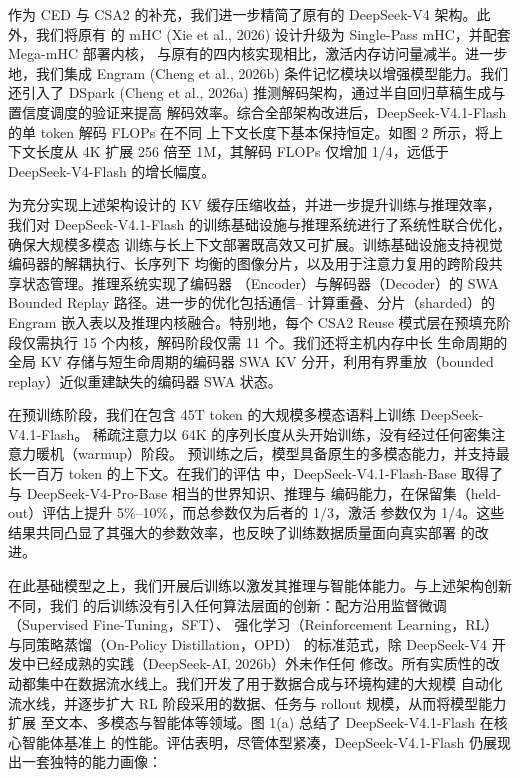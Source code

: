 作为 CED 与 CSA2 的补充，我们进一步精简了原有的 DeepSeek-V4 架构。此外，我们将原有
的 mHC (Xie et al., 2026) 设计升级为 Single-Pass mHC，并配套 Mega-mHC 部署内核，
与原有的四内核实现相比，激活内存访问量减半。进一步地，我们集成 Engram
(Cheng et al., 2026b) 条件记忆模块以增强模型能力。我们还引入了 DSpark
(Cheng et al., 2026a) 推测解码架构，通过半自回归草稿生成与置信度调度的验证来提高
解码效率。综合全部架构改进后，DeepSeek-V4.1-Flash 的单 token 解码 FLOPs 在不同
上下文长度下基本保持恒定。如图 2 所示，将上下文长度从 4K 扩展 256 倍至 1M，其解码
FLOPs 仅增加 1/4，远低于 DeepSeek-V4-Flash 的增长幅度。

为充分实现上述架构设计的 KV 缓存压缩收益，并进一步提升训练与推理效率，我们对
DeepSeek-V4.1-Flash 的训练基础设施与推理系统进行了系统性联合优化，确保大规模多模态
训练与长上下文部署既高效又可扩展。训练基础设施支持视觉编码器的解耦执行、长序列下
均衡的图像分片，以及用于注意力复用的跨阶段共享状态管理。推理系统实现了编码器
（Encoder）与解码器（Decoder）的 SWA Bounded Replay 路径。进一步的优化包括通信--
计算重叠、分片（sharded）的 Engram 嵌入表以及推理内核融合。特别地，每个 CSA2 Reuse
模式层在预填充阶段仅需执行 15 个内核，解码阶段仅需 11 个。我们还将主机内存中长
生命周期的全局 KV 存储与短生命周期的编码器 SWA KV 分开，利用有界重放（bounded
replay）近似重建缺失的编码器 SWA 状态。



在预训练阶段，我们在包含 45T token 的大规模多模态语料上训练 DeepSeek-V4.1-Flash。
稀疏注意力以 64K 的序列长度从头开始训练，没有经过任何密集注意力暖机（warmup）阶段。
预训练之后，模型具备原生的多模态能力，并支持最长一百万 token 的上下文。在我们的评估
中，DeepSeek-V4.1-Flash-Base 取得了与 DeepSeek-V4-Pro-Base 相当的世界知识、推理与
编码能力，在保留集（held-out）评估上提升 5\%--10\%，而总参数仅为后者的 1/3，激活
参数仅为 1/4。这些结果共同凸显了其强大的参数效率，也反映了训练数据质量面向真实部署
的改进。

在此基础模型之上，我们开展后训练以激发其推理与智能体能力。与上述架构创新不同，我们
的后训练没有引入任何算法层面的创新：配方沿用监督微调（Supervised Fine-Tuning，SFT）、
强化学习（Reinforcement Learning，RL）与同策略蒸馏（On-Policy Distillation，OPD）
的标准范式，除 DeepSeek-V4 开发中已经成熟的实践（DeepSeek-AI, 2026b）外未作任何
修改。所有实质性的改动都集中在数据流水线上。我们开发了用于数据合成与环境构建的大规模
自动化流水线，并逐步扩大 RL 阶段采用的数据、任务与 rollout 规模，从而将模型能力扩展
至文本、多模态与智能体等领域。图 1(a) 总结了 DeepSeek-V4.1-Flash 在核心智能体基准上
的性能。评估表明，尽管体型紧凑，DeepSeek-V4.1-Flash 仍展现出一套独特的能力画像：

